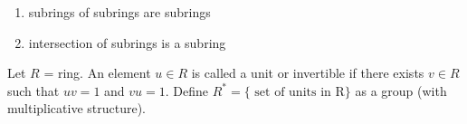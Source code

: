 \begin{proposition}
    \begin{enumerate}
        \item subrings of subrings are subrings
        \item intersection of subrings is a subring
    \end{enumerate}
\end{proposition}

\begin{prop-defn}[Units]
Let \(R\) = ring. An element \(u \in R\) is called a unit or invertible if there exists \(v \in R\) such that \(uv = 1\) and \(vu = 1\). Define \(R^* = \{\text{ set of units in R}\}\) as a group (with multiplicative structure).
\end{prop-defn}

